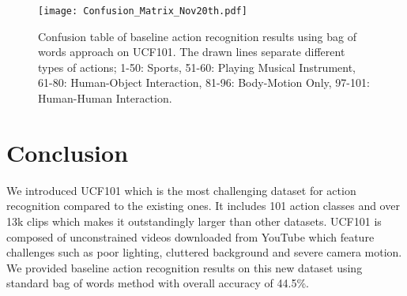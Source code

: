 \documentclass[10pt,twocolumn,letterpaper]{article}
\begin{document}
\begin{figure*}
\begin{center}
   \texttt{[image: Confusion\_Matrix\_Nov20th.pdf]}
\end{center}
   \caption{Confusion table of baseline action recognition results using bag of words approach on UCF101. The drawn lines separate different types of actions; 1-50: Sports, 51-60: Playing Musical Instrument, 61-80: Human-Object Interaction, 81-96: Body-Motion Only, 97-101: Human-Human Interaction.}
\label{fig:confusion}
\end{figure*}


\section{Conclusion}

We introduced UCF101 which is the most challenging dataset for action recognition compared to the existing ones. It includes 101 action classes and over 13k clips which makes it outstandingly larger than other datasets. UCF101 is composed of unconstrained videos downloaded from YouTube which feature challenges such as poor lighting, cluttered background and severe camera motion. We provided baseline action recognition results on this new dataset using standard bag of words method with overall accuracy of 44.5\%.

{\small


}
\end{document}
